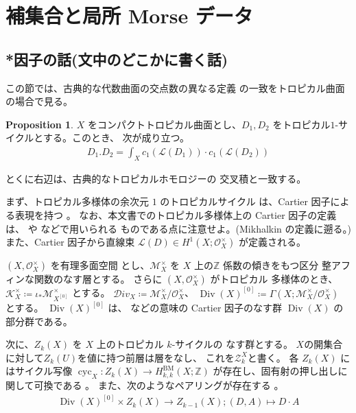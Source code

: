 \documentclass[a4paper,dvipdfmx,reqno,12pt]{amsart}
\theoremstyle{definition}
\newtheorem{proposition}[theorem]{Proposition}
\newcommand{\deq}{\coloneqq}
\newcommand{\opn}[1]{\operatorname{#1}}
\numberwithin{equation}{section}
\begin{document}
\section{補集合と局所 Morse データ}




\subsection{*因子の話(文中のどこかに書く話)}
この節では、古典的な代数曲面の交点数の異なる定義
の一致をトロピカル曲面の場合で見る。
\begin{proposition}
\label{proposition-cycle-chern}
$X$ をコンパクトトロピカル曲面とし、$D_1,D_2$
をトロピカル$1$-サイクルとする。このとき、
次が成り立つ。
\begin{align}
D_1 . D_2=\int_X c_1(\mathcal{L}(D_1))
\cdot c_1(\mathcal{L}(D_2))
\end{align}

とくに右辺は、古典的なトロピカルホモロジーの
交叉積と一致する。

\end{proposition}

まず、トロピカル多様体の余次元 $1$ のトロピカルサイクル
は、Cartier 因子による表現を持つ
\cite[Proposition 3.27]{shaw2015tropical}。
なお、本文書でのトロピカル多様体上の 
Cartier 因子の定義は、
\cite{shaw2015tropical} や
\cite{demedrano2023chern} などで用いられる
ものである点に注意せよ。(Mikhalkin の定義に遡る。)
また、Cartier 因子から直線束
$\mathcal{L}(D)\in H^{1}(X;\mathcal{O}_X^{\times})$
が定義される。

$(X,\mathcal{O}_X^{\times})$ を有理多面空間
とし、$\mathcal{M}_X^{\times}$ を
$X$ 上の$\mathbb{Z}$ 係数の傾きをもつ区分
整アフィンな関数のなす層とする。
さらに $(X,\mathcal{O}_X^{\times})$ がトロピカル
多様体のとき、
$\mathcal{K}_{X}^{\times}
\deq \iota_*\mathcal{M}_{X^{[0]}}^{\times}$
とする。
$\mathcal{D}iv_X\deq \mathcal{M}_X^{\times}/
\mathcal{O}_X^{\times}$、
$\opn{Div}(X)^{[0]}\deq \Gamma(X;\mathcal{M}_X^{\times}/
\mathcal{O}_X^{\times})$
とする\cite[Deifinition 3.10]{MR4637248}。
$\opn{Div}(X)^{[0]}$ は、
\cite{demedrano2023chern} などの意味の Cartier 
因子のなす群 $\opn{Div}(X)$ の部分群である。

次に、$Z_k(X)$ を $X$ 上のトロピカル $k$-サイクルの
なす群とする\cite[Definition 3.5]{MR4637248}。
$X$の開集合に対して$Z_k(U)$を値に持つ前層は層をなし、
これを$\mathscr{Z}_k^{X}$と書く。
各 $Z_k(X)$ にはサイクル写像
$\opn{cyc}_X \colon Z_k(X)\to 
H^{\mathrm{BM}}_{k,k}(X;\mathbb{Z})$
が存在し、固有射の押し出しに関して可換である
\cite[Definition 5.4 and Corollary 5.8]{MR4637248}。
また、次のようなペアリングが存在する
\cite[]{MR4637248}。
\begin{align}
\label{equation-divisor-pairing}
\opn{Div}(X)^{[0]}\times Z_{k}(X)\to Z_{k-1}(X);
(D,A) \mapsto D\cdot A
\end{align}
\end{document}
